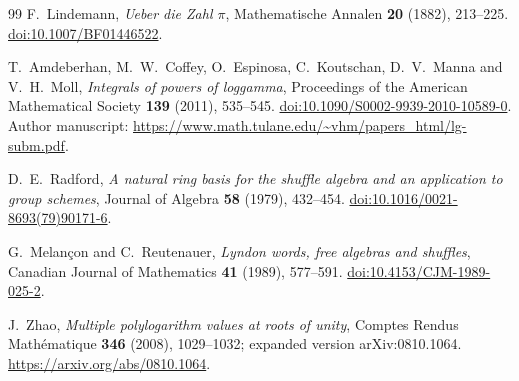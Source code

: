 \begin{thebibliography}{99}
F.~Lindemann, \emph{Ueber die Zahl $\pi$},
Mathematische Annalen \textbf{20} (1882), 213--225.
\href{https://doi.org/10.1007/BF01446522}{doi:10.1007/BF01446522}.

T.~Amdeberhan, M.~W.~Coffey, O.~Espinosa, C.~Koutschan,
D.~V.~Manna and V.~H.~Moll,
\emph{Integrals of powers of loggamma},
Proceedings of the American Mathematical Society \textbf{139} (2011),
535--545.
\href{https://doi.org/10.1090/S0002-9939-2010-10589-0}{doi:10.1090/S0002-9939-2010-10589-0}.
Author manuscript: \url{https://www.math.tulane.edu/~vhm/papers_html/lg-subm.pdf}.

D.~E.~Radford,
\emph{A natural ring basis for the shuffle algebra and an application
to group schemes}, Journal of Algebra \textbf{58} (1979), 432--454.
\href{https://doi.org/10.1016/0021-8693(79)90171-6}{doi:10.1016/0021-8693(79)90171-6}.

G.~Melan\c{c}on and C.~Reutenauer,
\emph{Lyndon words, free algebras and shuffles},
Canadian Journal of Mathematics \textbf{41} (1989), 577--591.
\href{https://doi.org/10.4153/CJM-1989-025-2}{doi:10.4153/CJM-1989-025-2}.

J.~Zhao, \emph{Multiple polylogarithm values at roots of unity},
Comptes Rendus Math\'ematique \textbf{346} (2008), 1029--1032;
expanded version arXiv:0810.1064.
\url{https://arxiv.org/abs/0810.1064}.

\end{thebibliography}
